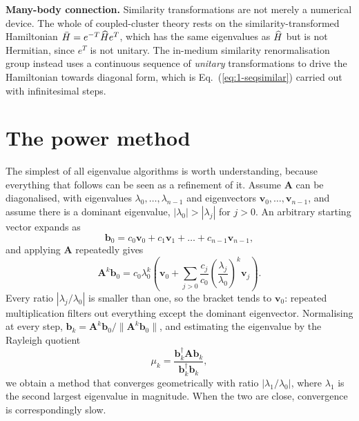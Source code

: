 \begin{notebox}
\textbf{Many-body connection.} Similarity transformations are not merely a
numerical device.  The whole of coupled-cluster theory rests on the
similarity-transformed Hamiltonian $\bar{H}=e^{-T}\widehat{H}e^{T}$, which has the
same eigenvalues as $\widehat{H}$ but is not Hermitian, since $e^{T}$ is not
unitary.  The in-medium similarity renormalisation group instead uses a
continuous sequence of \emph{unitary} transformations to drive the Hamiltonian
towards diagonal form, which is Eq.~(\ref{eq:1-seqsimilar}) carried out with
infinitesimal steps.
\end{notebox}

\section{The power method}
\label{sec:power}

The simplest of all eigenvalue algorithms is worth understanding, because
everything that follows can be seen as a refinement of it.  Assume $\bm{A}$
can be diagonalised, with eigenvalues $\lambda_0,\dots,\lambda_{n-1}$ and
eigenvectors $\bm{v}_0,\dots,\bm{v}_{n-1}$, and assume there is a dominant
eigenvalue, $|\lambda_0|>|\lambda_j|$ for $j>0$.  An arbitrary starting vector
expands as
\begin{equation}
  \bm{b}_0 = c_0\bm{v}_0 + c_1\bm{v}_1 + \dots + c_{n-1}\bm{v}_{n-1},
  \label{eq:1-powerexpand}
\end{equation}
and applying $\bm{A}$ repeatedly gives
\begin{equation}
  \bm{A}^{k}\bm{b}_0
   = c_0\lambda_0^{k}
     \left(\bm{v}_0
       + \sum_{j>0}\frac{c_j}{c_0}
         \left(\frac{\lambda_j}{\lambda_0}\right)^{k}\bm{v}_j\right).
  \label{eq:1-powerapply}
\end{equation}
Every ratio $|\lambda_j/\lambda_0|$ is smaller than one, so the bracket tends
to $\bm{v}_0$: repeated multiplication filters out everything except the
dominant eigenvector.  Normalising at every step,
$\bm{b}_{k}=\bm{A}^{k}\bm{b}_0/\|\bm{A}^{k}\bm{b}_0\|$, and estimating the
eigenvalue by the Rayleigh quotient
\begin{equation}
  \mu_k = \frac{\bm{b}_k^{\dagger}\bm{A}\bm{b}_k}
               {\bm{b}_k^{\dagger}\bm{b}_k},
  \label{eq:1-rayleigh}
\end{equation}
we obtain a method that converges geometrically with ratio
$|\lambda_1/\lambda_0|$, where $\lambda_1$ is the second largest eigenvalue in
magnitude.  When the two are close, convergence is correspondingly slow.

